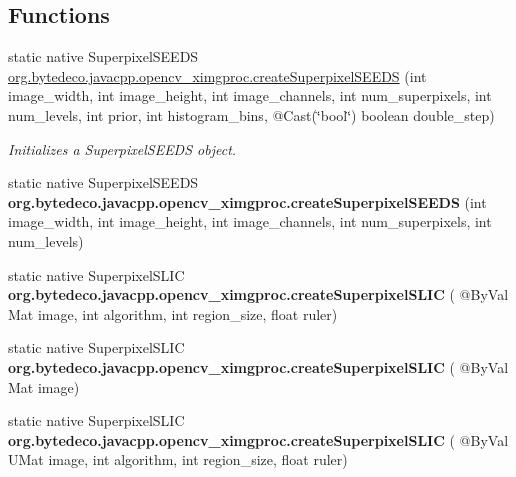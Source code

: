 \subsection*{Functions}
\begin{DoxyCompactItemize}
\item 
static native Superpixel\+S\+E\+E\+DS \hyperlink{group__ximgproc__superpixel_ga16f41a6ddd22daf4d1f1851a6f689466}{org.\+bytedeco.\+javacpp.\+opencv\+\_\+ximgproc.\+create\+Superpixel\+S\+E\+E\+DS} (int image\+\_\+width, int image\+\_\+height, int image\+\_\+channels, int num\+\_\+superpixels, int num\+\_\+levels, int prior, int histogram\+\_\+bins, @Cast(\char`\"{}bool\char`\"{}) boolean double\+\_\+step)
\begin{DoxyCompactList}\small\item\em Initializes a Superpixel\+S\+E\+E\+DS object. \end{DoxyCompactList}\item 
\mbox{\label{group__ximgproc__superpixel_ga119e78e73ef65f8b2e9268d85fe8ea90}} 
static native Superpixel\+S\+E\+E\+DS {\bfseries org.\+bytedeco.\+javacpp.\+opencv\+\_\+ximgproc.\+create\+Superpixel\+S\+E\+E\+DS} (int image\+\_\+width, int image\+\_\+height, int image\+\_\+channels, int num\+\_\+superpixels, int num\+\_\+levels)
\item 
\mbox{\label{group__ximgproc__superpixel_gadf285656f6d547291ca62b7cd41e65ff}} 
static native Superpixel\+S\+L\+IC {\bfseries org.\+bytedeco.\+javacpp.\+opencv\+\_\+ximgproc.\+create\+Superpixel\+S\+L\+IC} ( @By\+Val Mat image, int algorithm, int region\+\_\+size, float ruler)
\item 
\mbox{\label{group__ximgproc__superpixel_ga66105720ce89d3021bf932fbf1b17594}} 
static native Superpixel\+S\+L\+IC {\bfseries org.\+bytedeco.\+javacpp.\+opencv\+\_\+ximgproc.\+create\+Superpixel\+S\+L\+IC} ( @By\+Val Mat image)
\item 
\mbox{\label{group__ximgproc__superpixel_ga8d99f0667e24d2e4cbc5b04b114db516}} 
static native Superpixel\+S\+L\+IC {\bfseries org.\+bytedeco.\+javacpp.\+opencv\+\_\+ximgproc.\+create\+Superpixel\+S\+L\+IC} ( @By\+Val U\+Mat image, int algorithm, int region\+\_\+size, float ruler)
\item 
\mbox{\label{group__ximgproc__superpixel_ga1b8417959af24cd2822a6a9f17419a0f}} 

\end{DoxyCompactItemize}
